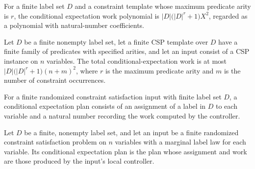 \begin{definition}
\label{FABL.FiniteRandomizedCSPInput.conditionalExpectationWorkPolynomial}
\leanok
{}
For a finite label set $D$ and a constraint template whose maximum predicate arity is
$r$, the conditional expectation work polynomial is $|D|\bigl(|D|^r+1\bigr)X^2$,
regarded as a polynomial with natural-number coefficients.
\end{definition}

\begin{theorem}
\label{FABL.FiniteRandomizedCSPInput.conditionalExpectationWork_le_polynomial}
\leanok
{}
Let $D$ be a finite nonempty label set, let a finite CSP template over $D$ have a finite
family of predicates with specified arities, and let an input consist of a CSP instance
on $n$ variables. The total conditional-expectation work is at most
$|D|\bigl(|D|^{r}+1\bigr)(n+m)^2$, where $r$ is the maximum predicate arity and $m$ is
the number of constraint occurrences.
\end{theorem}

\begin{definition}
\label{FABL.FiniteRandomizedCSPInput.ConditionalExpectationPlan}
\leanok
{}
For a finite randomized constraint satisfaction input with finite label set $D$, a
conditional expectation plan consists of an assignment of a label in $D$ to each
variable and a natural number recording the work computed by the controller.
\end{definition}

\begin{definition}
\label{FABL.FiniteRandomizedCSPInput.conditionalExpectationPlan}
\leanok
{}
Let $D$ be a finite, nonempty label set, and let an input be a finite randomized
constraint satisfaction problem on $n$ variables with a marginal label law for each
variable. Its conditional expectation plan is the plan whose assignment and work are
those produced by the input's local controller.
\end{definition}

